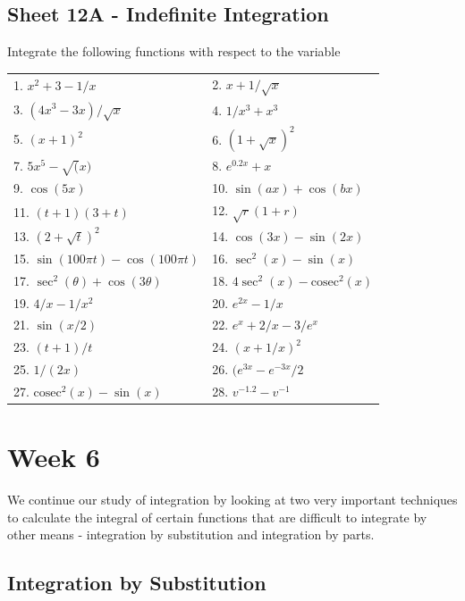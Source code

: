 \documentclass[
  11pt,
  oneside]{book}
\newcommand{\slide}{}
\theoremstyle{definition}
\theoremstyle{definition}
\theoremstyle{definition}
\theoremstyle{definition}
\theoremstyle{remark}
\begin{document}
\slide

\section{Sheet 12A - Indefinite Integration}\label{sheet-12a---indefinite-integration}

Integrate the following functions with respect to the variable

\slide

\begin{tabular}{l|l}
\hline
 & \\
\hline
1. $x^2+3-1/x$ & 2. $x+1/\sqrt{x}$\\
\hline
3. $(4x^3-3x)/\sqrt{x}$ & 4. $1/x^3+x^3$\\
\hline
5. $(x+1)^2$ & 6. $(1+\sqrt{x})^2$\\
\hline
7. $5x^5-\sqrt(x)$ & 8. $e^{0.2x}+x$\\
\hline
9. $\cos(5x)$ & 10. $\sin(ax)+\cos(bx)$\\
\hline
11. $(t+1)(3+t)$ & 12. $\sqrt{r}(1+r)$\\
\hline
13. $(2+\sqrt{t})^2$ & 14. $\cos(3x)-\sin(2x)$\\
\hline
15. $\sin(100\pi t)-\cos(100\pi t)$ & 16. $\sec^2(x)-\sin(x)$\\
\hline
17. $\sec^2(\theta)+\cos(3\theta)$ & 18. $4\sec^2(x)-\text{cosec}^2(x)$\\
\hline
19. $4/x-1/x^2$ & 20. $e^{2x}-1/x$\\
\hline
21. $\sin(x/2)$ & 22. $e^x+2/x-3/e^x$\\
\hline
23. $(t+1)/t$ & 24. $(x+1/x)^2$\\
\hline
25. $1/(2x)$ & 26. $(e^{3x}-e^{-3x}/2$\\
\hline
27. $\text{cosec}^2(x)-\sin(x)$ & 28. $v^{-1.2}-v^{-1}$\\
\hline
\end{tabular}

\chapter{Week 6}\label{week-six}

We continue our study of integration by looking at two very important techniques to calculate the integral of certain functions that are difficult to integrate by other means - integration by substitution and integration by parts.

\slide

\section{Integration by Substitution}\label{integration-by-substitution}
\end{document}
